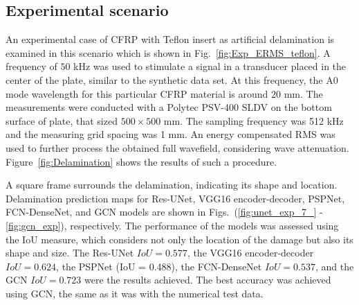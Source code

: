 \subsection{Experimental scenario}
An experimental case of CFRP with Teflon insert as artificial delamination is examined in this scenario which is shown in Fig.~\ref{fig:Exp_ERMS_teflon}. 
A frequency of \(50\) kHz was used to stimulate a signal in a transducer placed in the center of the plate, similar to the synthetic data set.
At this frequency, the A0 mode wavelength for this particular CFRP material is around \(20\) mm.
The measurements were conducted with a Polytec PSV-400 SLDV on the bottom surface of plate, that sized \(500 \times 500\) mm.
The sampling frequency was 512 kHz and the measuring grid spacing was 1 mm.
An energy compensated RMS was used to further process the obtained full wavefield, considering wave attenuation.
Figure~\ref{fig:Delamination} shows the results of such a procedure.

A square frame surrounds the delamination, indicating its shape and location.
Delamination prediction maps for Res-UNet, VGG16 encoder-decoder, PSPNet, FCN-DenseNet, and GCN models are shown in Figs.~(\ref{fig:unet_exp_7_} - \ref{fig:gcn_exp}), respectively.
The performance of the models was assessed using the IoU measure, which considers not only the location of the damage but also its shape and size.
The Res-UNet \(IoU = 0.577\), the VGG16 encoder-decoder \(IoU = 0.624\), the PSPNet (IoU = 0.488), the FCN-DenseNet \(IoU = 0.537\), and the GCN \(IoU = 0.723\) were the results achieved.
The best accuracy was achieved using GCN, the same as it was with the numerical test data.


